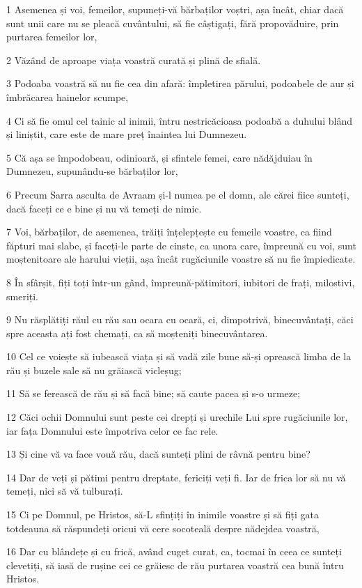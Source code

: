 \par 1 Asemenea și voi, femeilor, supuneți-vă bărbaților voștri, așa încât, chiar dacă sunt unii care nu se pleacă cuvântului, să fie câștigați, fără propovăduire, prin purtarea femeilor lor,
\par 2 Văzând de aproape viața voastră curată și plină de sfială.
\par 3 Podoaba voastră să nu fie cea din afară: împletirea părului, podoabele de aur și îmbrăcarea hainelor scumpe,
\par 4 Ci să fie omul cel tainic al inimii, întru nestricăcioasa podoabă a duhului blând și liniștit, care este de mare preț înaintea lui Dumnezeu.
\par 5 Că așa se împodobeau, odinioară, și sfintele femei, care nădăjduiau în Dumnezeu, supunându-se bărbaților lor,
\par 6 Precum Sarra asculta de Avraam și-l numea pe el domn, ale cărei fiice sunteți, dacă faceți ce e bine și nu vă temeți de nimic.
\par 7 Voi, bărbaților, de asemenea, trăiți înțelepțește cu femeile voastre, ca fiind făpturi mai slabe, și faceți-le parte de cinste, ca unora care, împreună cu voi, sunt moștenitoare ale harului vieții, așa încât rugăciunile voastre să nu fie împiedicate.
\par 8 În sfârșit, fiți toți într-un gând, împreună-pătimitori, iubitori de frați, milostivi, smeriți.
\par 9 Nu răsplătiți răul cu rău sau ocara cu ocară, ci, dimpotrivă, binecuvântați, căci spre aceasta ați fost chemați, ca să moșteniți binecuvântarea.
\par 10 Cel ce voiește să iubească viața și să vadă zile bune să-și oprească limba de la rău și buzele sale să nu grăiască vicleșug;
\par 11 Să se ferească de rău și să facă bine; să caute pacea și s-o urmeze;
\par 12 Căci ochii Domnului sunt peste cei drepți și urechile Lui spre rugăciunile lor, iar fața Domnului este împotriva celor ce fac rele.
\par 13 Și cine vă va face vouă rău, dacă sunteți plini de râvnă pentru bine?
\par 14 Dar de veți și pătimi pentru dreptate, fericiți veți fi. Iar de frica lor să nu vă temeți, nici să vă tulburați.
\par 15 Ci pe Domnul, pe Hristos, să-L sfințiți în inimile voastre și să fiți gata totdeauna să răspundeți oricui vă cere socoteală despre nădejdea voastră,
\par 16 Dar cu blândețe și cu frică, având cuget curat, ca, tocmai în ceea ce sunteți clevetiți, să iasă de rușine cei ce grăiesc de rău purtarea voastră cea bună întru Hristos.
